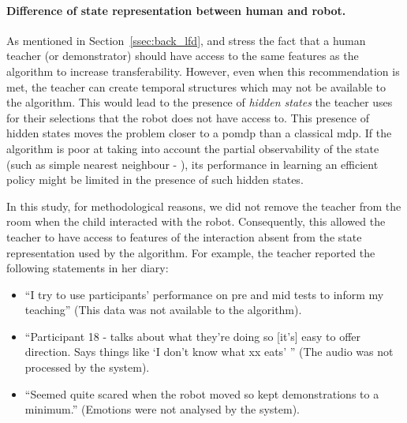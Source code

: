 
\paragraph{Difference of state representation between human and robot.} \label{sec:differences_representation}

As mentioned in Section~\ref{ssec:back_lfd}, \cite{knox2014learning} and \cite{sequeira2016discovering} stress the fact that a human teacher (or demonstrator) should have access to the same features as the algorithm to increase transferability. However, even when this recommendation is met, the teacher can create temporal structures which may not be available to the algorithm. This would lead to the presence of \emph{hidden states} the teacher uses for their selections that the robot does not have access to. This presence of hidden states moves the problem closer to a \gls{pomdp} than a classical \gls{mdp}. If the algorithm is poor at taking into account the partial observability of the state (such as simple nearest neighbour - \citealt{mccallum1995instance}), its performance in learning an efficient policy might be limited in the presence of such hidden states.

In this study, for methodological reasons, we did not remove the teacher from the room when the child interacted with the robot. Consequently, this allowed the teacher to have access to features of the interaction absent from the state representation used by the algorithm. For example, the teacher reported the following statements in her diary: 
\begin{itemize}
	\item ``I try to use participants’ performance on pre and mid tests to inform my teaching'' (This data was not available to the algorithm).
	\item ``Participant 18 - talks about what they’re doing so [it's] easy to offer direction. Says things like `I don’t know what xx eats' '' (The audio was not processed by the system).
	\item ``Seemed quite scared when the robot moved so kept demonstrations to a minimum.'' (Emotions were not analysed by the system).
\end{itemize}

